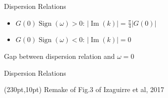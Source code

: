 \documentclass[9pt]{beamer}
\begin{document}
\begin{darkframes}
\begin{frame}{Dispersion Relations}
\pause

\begin{itemize}
   \item $G(0) \operatorname{Sign}(\omega) > 0$: $\lvert \operatorname{Im}(k) \rvert  =  \frac{\pi}{4}\lvert G(0)\rvert$
   \item $G(0) \operatorname{Sign}(\omega) < 0$: $\lvert \operatorname{Im}(k) \rvert  = 0$
\end{itemize}

\pause
\begin{tcolorbox}
   Gap between dispersion relation and $\omega=0$
\end{tcolorbox}


%
%




\end{frame}

\begin{frame}{Dispersion Relations}


       \begin{textblock*}{100pt}(230pt,10pt)
           Remake of Fig.3 of Izaguirre et al, 2017
       \end{textblock*}


\end{frame}
\end{darkframes}
\end{document}
